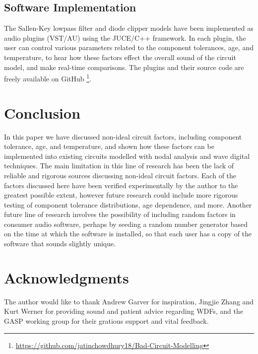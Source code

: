 \documentclass[twoside,a4paper]{article}
\begin{document}
\subsection{Software Implementation} \label{sec:soft-impl}
%
The Sallen-Key lowpass filter and diode clipper models have been implemented
as audio plugins (VST/AU) using the JUCE/C++ framework. In each plugin,
the user can control various parameters related to the component
tolerances, age, and temperature, to hear how these factors effect the
overall sound of the circuit model, and make real-time comparisons. The
plugins and their source code are freely available on GitHub
\footnote{\url{https://github.com/jatinchowdhury18/Bad-Circuit-Modelling}}.

\section{Conclusion} \label{sec:conclusion}
%
In this paper we have discussed non-ideal circuit factors, including
component tolerance, age, and temperature, and shown how these factors
can be implemented into existing circuits modelled with nodal analysis
and wave digital techniques.
\newline\newline
The main limitation in this line of research has been the lack of
reliable and rigorous sources discussing non-ideal circuit factors.
Each of the factors discussed here have been verified experimentally
by the author to the greatest possible extent, however future research
could include more rigorous testing of component tolerance distributions,
age dependence, and more. Another future line of research involves the
possibility of including random factors in consumer audio software, perhaps
by seeding a random number generator based on the time at which the
software is installed, so that each user has a copy of the software that
sounds slightly unique.

\section{Acknowledgments}
%
The author would like to thank Andrew Garver for inspiration, Jingjie Zhang
and Kurt Werner for providing sound and patient advice regarding WDFs, and the
GASP working group for their gratious support and vital feedback.

\nocite{*}


\end{document}
